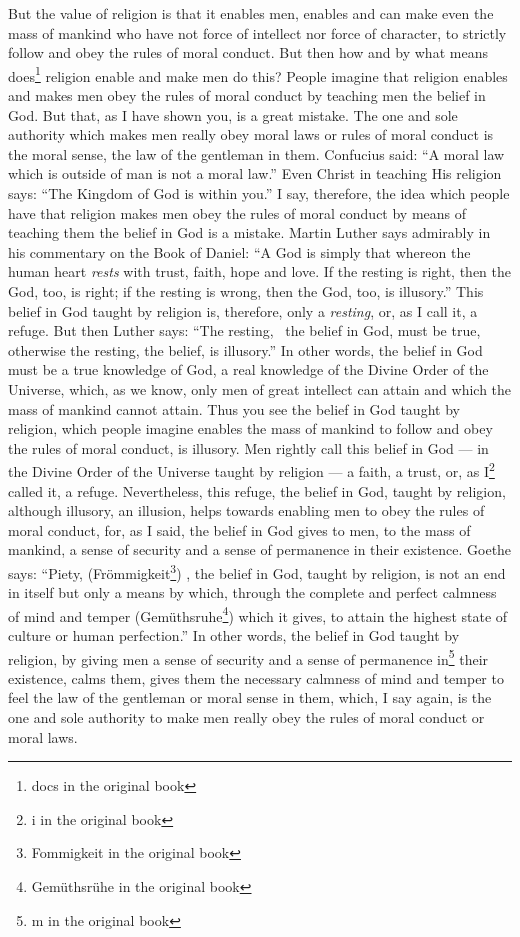 But the value of religion is that it enables men, enables and can make even the mass of mankind who have not force of intellect nor force of character, to strictly follow and obey the rules of moral conduct.
But then how and by what means does\footnote{docs in the original book} religion enable and make men do this?
People imagine that religion enables and makes men obey the rules of moral conduct by teaching men the belief in God.
But that, as I have shown you, is a great mistake.
The one and sole authority which makes men really obey moral laws or rules of moral conduct is the moral sense, the law of the gentleman in them.
Confucius said: ``A moral law which is outside of man is not a moral law.''
Even Christ in teaching His religion says: ``The Kingdom of God is within you.''
I say, therefore, the idea which people have that religion makes men obey the rules of moral conduct by means of teaching them the belief in God is a mistake.
Martin Luther says admirably in his commentary on the Book of Daniel: ``A God is simply that whereon the human heart \emph{rests} with trust, faith, hope and love. If the resting is right, then the God, too, is right; if the resting is wrong, then the God, too, is illusory.''
This belief in God taught by religion is, therefore, only a \emph{resting}, or, as I call it, a refuge.
But then Luther says: ``The resting, \ie\, the belief in God, must be true, otherwise the resting, the belief, is illusory.''
In other words, the belief in God must be a true knowledge of God, a real knowledge of the Divine Order of the Universe, which, as we know, only men of great intellect can attain and which the mass of mankind cannot attain.
Thus you see the belief in God taught by religion, which people imagine enables the mass of mankind to follow and obey the rules of moral conduct, is illusory.
Men rightly call this belief in God --- in the Divine Order of the Universe taught by religion --- a faith, a trust, or, as I\footnote{i in the original book} called it, a refuge.
Nevertheless, this refuge, the belief in God, taught by religion, although illusory, an illusion, helps towards enabling men to obey the rules of moral conduct, for, as I said, the belief in God gives to men, to the mass of mankind, a sense of security and a sense of permanence in their existence.
Goethe says: ``Piety, (Fr\"ommigkeit\footnote{Fommigkeit in the original book}) \ie, the belief in God, taught by religion, is not an end in itself but only a means by which, through the complete and perfect calmness of mind and temper (Gem\"uthsruhe\footnote{Gem\"uthsr\"uhe in the original book}) which it gives, to attain the highest state of culture or human perfection.''
In other words, the belief in God taught by religion, by giving men a sense of security and a sense of permanence in\footnote{m in the original book} their existence, calms them, gives them the necessary calmness of mind and temper to feel the law of the gentleman or moral sense in them, which, I say again, is the one and sole authority to make men really obey the rules of moral conduct or moral laws.

